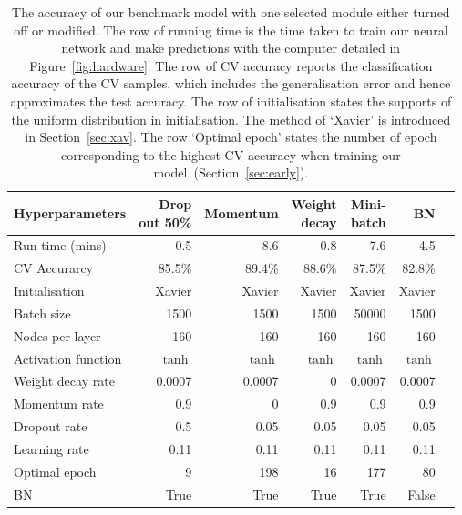 \begin{table}
\caption{The accuracy of our benchmark model with one selected module either turned off or modified. The row of running time is the time taken to train our neural network and make predictions with the computer detailed in Figure~\ref{fig:hardware}. The row of CV accuracy reports the classification accuracy of the CV samples, which includes the generalisation error and hence approximates the test accuracy. The row of initialisation states the supports of the uniform distribution in initialisation. The method of `Xavier' is introduced in Section~\ref{sec:xav}. The row `Optimal epoch' states the number of epoch corresponding to the highest CV accuracy when training our model~(Section~\ref{sec:early}).
\label{tb:comp}}
\centering
{\centering
\begin{tabular}{@{}lrrrrrr@{}}
\toprule
Hyperparameters             & {\parbox[t]{1.4cm}{\raggedleft Drop \\out 50\%}  } 
& Momentum & {\parbox[t]{1.3cm}{\raggedleft Weight \\decay}} & {\parbox[t]{1.3cm}{\raggedleft Mini-\\batch}} & BN \\ \midrule
Run time (mins)             & 0.5        & 8.6          & 0.8      & 7.6 & 4.5          \\
CV Accurarcy                   & 85.5\%     & 89.4\%       & 88.6\%   & 87.5\% &82.8\%       \\ \midrule
Initialisation              & Xavier     & Xavier       & Xavier   & Xavier & Xavier        \\
Batch size                   & 1500       & 1500         & 1500     & 50000    & 1500        \\
Nodes per layer        & 160        & 160          & 160      & 160    & 160         \\
Activation function        & $\tanh$    & $\tanh$      & $\tanh$  & $\tanh$  & $\tanh$       \\
Weight decay rate          & 0.0007     & 0.0007       & 0        & 0.0007  & 0.0007        \\
Momentum rate                & 0.9        & 0            & 0.9      & 0.9    & 0.9         \\
Dropout rate                & 0.5        & 0.05         & 0.05     & 0.05    & 0.05        \\
Learning rate                & 0.11       & 0.11         & 0.11     & 0.11    & 0.11       \\
Optimal epoch       & 9          & 198          & 16       & 177     & 80       \\ 
BN       & True          & True          & True       & True     & False       \\ \bottomrule
\end{tabular}
}
\end{table}


